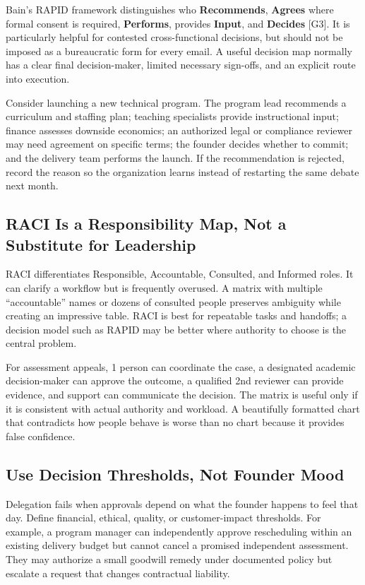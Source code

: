 Bain's RAPID framework distinguishes who \textbf{Recommends}, \textbf{Agrees} where formal consent is required, \textbf{Performs}, provides \textbf{Input}, and \textbf{Decides} [G3]. It is particularly helpful for contested cross-functional decisions, but should not be imposed as a bureaucratic form for every email. A useful decision map normally has a clear final decision-maker, limited necessary sign-offs, and an explicit route into execution.

Consider launching a new technical program. The program lead recommends a curriculum and staffing plan; teaching specialists provide instructional input; finance assesses downside economics; an authorized legal or compliance reviewer may need agreement on specific terms; the founder decides whether to commit; and the delivery team performs the launch. If the recommendation is rejected, record the reason so the organization learns instead of restarting the same debate next month.

\subsection{RACI Is a Responsibility Map, Not a Substitute for Leadership}
\label{sec:raci_map_limits}

RACI differentiates Responsible, Accountable, Consulted, and Informed roles. It can clarify a workflow but is frequently overused. A matrix with multiple ``accountable'' names or dozens of consulted people preserves ambiguity while creating an impressive table. RACI is best for repeatable tasks and handoffs; a decision model such as RAPID may be better where authority to choose is the central problem.

For assessment appeals, 1 person can coordinate the case, a designated academic decision-maker can approve the outcome, a qualified 2nd reviewer can provide evidence, and support can communicate the decision. The matrix is useful only if it is consistent with actual authority and workload. A beautifully formatted chart that contradicts how people behave is worse than no chart because it provides false confidence.

\subsection{Use Decision Thresholds, Not Founder Mood}
\label{sec:decision_thresholds_not_mood}

Delegation fails when approvals depend on what the founder happens to feel that day. Define financial, ethical, quality, or customer-impact thresholds. For example, a program manager can independently approve rescheduling within an existing delivery budget but cannot cancel a promised independent assessment. They may authorize a small goodwill remedy under documented policy but escalate a request that changes contractual liability.

